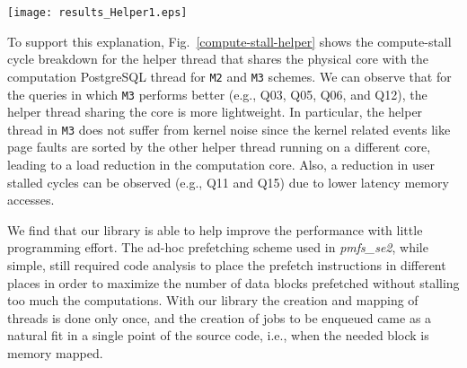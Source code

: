\begin{figure*}
\centering
\texttt{[image: results\_Helper1.eps]}
\caption{Execution time breakdown into compute and stall cycles for 
helper thread running on same physical core as PostgreSQL in M2 and M3. Execution time is normalized with respect to M2}
\label{compute-stall-helper}
\end{figure*}

To support this explanation, Fig.~\ref{compute-stall-helper} shows the compute-stall cycle breakdown for the helper thread that shares the physical core with the computation PostgreSQL thread for \verb+M2+ and \verb+M3+ schemes. We can observe that for the queries in which \verb+M3+ performs better (e.g., Q03, Q05, Q06, and Q12), the helper thread sharing the core is more lightweight. In particular, the helper thread in \verb+M3+ does not suffer from kernel noise since the kernel related events like page faults are sorted by the other helper thread running on a different core, leading to a load reduction in the computation core. Also, a reduction in user stalled cycles can be observed (e.g., Q11 and Q15) due to lower latency memory accesses.

We find that our library is able to help improve the performance with little programming effort. The ad-hoc prefetching scheme used in \emph{pmfs\_se2}, while simple, still required code analysis to place the prefetch instructions in different places in order to maximize the number of data blocks prefetched without stalling too much the computations. With our library the creation and mapping of threads is done only once, and the creation of jobs to be enqueued came as a natural fit in a single point of the source code, i.e., when the needed block is memory mapped.
